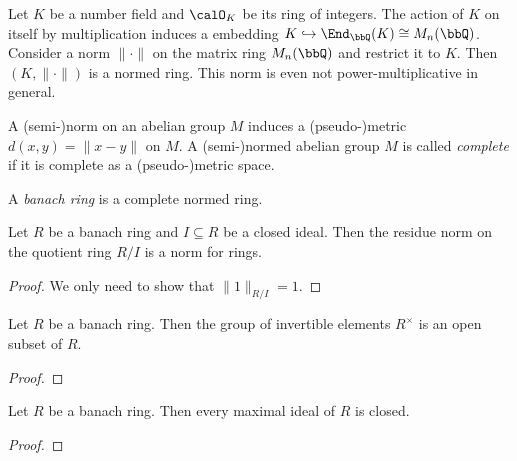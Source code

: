     \begin{example}\label{eg:number_fields_as_normed_rings_by_embedding_into_matrix_rings}
        Let \(K\) be a number field and \(\calO_K\) be its ring of integers.
        The action of \(K\) on itself by multiplication induces a embedding \(K \hookrightarrow \End_{\bbQ}(K) \cong M_n(\bbQ)\).
        Consider a norm \(\|\cdot\|\) on the matrix ring \(M_n(\bbQ)\) and restrict it to \(K\).
        Then \((K, \|\cdot\|)\) is a normed ring.
        This norm is even not power-multiplicative in general.
    \end{example}

    \begin{definition}\label{def:complete_semi-normed_abelian_group}
        A (semi-)norm on an abelian group \(M\) induces a (pseudo-)metric \(d(x,y) = \|x - y\|\) on \(M\).
        A (semi-)normed abelian group \(M\) is called \emph{complete} if it is complete as a (pseudo-)metric space.
    \end{definition}

    \begin{definition}\label{def:banach_ring}
        A \emph{banach ring} is a complete normed ring.
    \end{definition}

    \begin{proposition}\label{prop:residue_norm_is_a_norm_for_banach_rings}
        Let \(R\) be a banach ring and \(I \subseteq R\) be a closed ideal.
        Then the residue norm on the quotient ring \(R/I\) is a norm for rings.
    \end{proposition}
    \begin{proof}
        We only need to show that \(\|1\|_{R/I} = 1\).
    \end{proof}

    \begin{proposition}\label{prop:invertible_elements_form_an_open_subset_of_banach_rings}
        Let \(R\) be a banach ring.
        Then the group of invertible elements \(R^\times\) is an open subset of \(R\).
    \end{proposition}
    \begin{proof}
    \end{proof}

    \begin{corollary}\label{prop:maximal_ideal_of_banach_ring_is_closed}
        Let \(R\) be a banach ring.
        Then every maximal ideal of \(R\) is closed.
    \end{corollary}
    \begin{proof}
    \end{proof}

